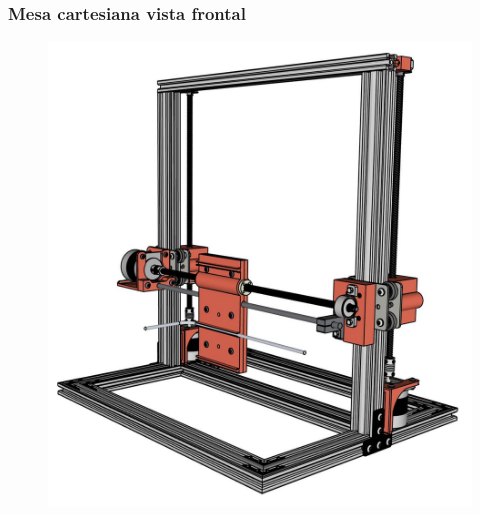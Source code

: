 \begin{frame}
    \frametitle{Mesa cartesiana vista frontal}
        \begin{figure}
            \centering
            \includegraphics[scale = 0.12]{figuras/mesacartesianaperfil}
        \end{figure}
\end{frame}

